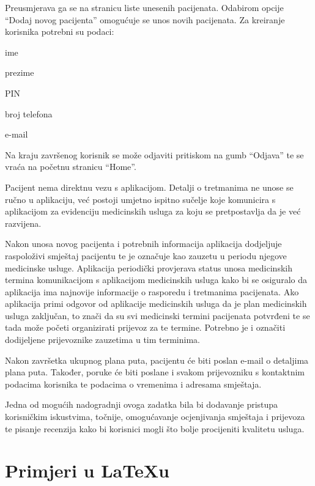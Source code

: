 		\noindent Preusmjerava ga se na stranicu liste unesenih pacijenata. Odabirom opcije “Dodaj novog pacijenta” omogućuje se unos novih pacijenata. Za kreiranje korisnika potrebni su podaci:

		\begin{packed_item}
			\item ime
			\item prezime
			\item PIN
			\item broj telefona
			\item e-mail
		\end{packed_item}
		
		\noindent Na kraju završenog korisnik se može odjaviti pritiskom na gumb “Odjava” te se vraća na početnu stranicu “Home”. 
		
		Pacijent nema direktnu vezu s aplikacijom. Detalji o tretmanima ne unose se ručno u aplikaciju, već postoji umjetno ispitno sučelje koje komunicira s aplikacijom za evidenciju medicinskih usluga za koju se pretpostavlja da je već razvijena.  
		
		Nakon unosa novog pacijenta i potrebnih informacija aplikacija dodjeljuje raspoloživi smještaj pacijentu te je označuje kao zauzetu u periodu njegove medicinske usluge. Aplikacija periodički provjerava status unosa medicinskih termina komunikacijom s aplikacijom medicinskih usluga kako bi se osiguralo da aplikacija ima najnovije informacije o rasporedu i tretmanima pacijenata. Ako aplikacija primi odgovor od aplikacije medicinskih usluga da je plan medicinskih usluga zaključan, to znači da su svi medicinski termini pacijenata potvrđeni te se tada može početi organizirati prijevoz za te termine. Potrebno je i označiti dodijeljene prijevoznike zauzetima u tim terminima. 
		
		Nakon završetka ukupnog plana puta, pacijentu će biti poslan e-mail o detaljima plana puta. Također, poruke će biti poslane i svakom prijevozniku s kontaktnim podacima korisnika te podacima o vremenima i adresama smještaja. 
		
		Jedna od mogućih nadogradnji ovoga zadatka bila bi dodavanje pristupa korisničkim iskustvima, točnije, omogućavanje ocjenjivanja smještaja i prijevoza te pisanje recenzija kako bi korisnici mogli što bolje procijeniti kvalitetu usluga.  
		
		\eject
		
		\section{Primjeri u \LaTeX u}
		
